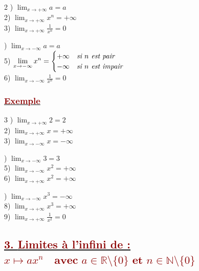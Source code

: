 \documentclass[12pt,a4paper]{article}
\begin{document}
\begin{multicols}{2}
) $\displaystyle \lim_{x \to +\infty} a = a$ \\[0.5cm]
2) $\displaystyle \lim_{x \to +\infty} x^n = +\infty$ \\[0.5cm]
3) $\displaystyle \lim_{x \to +\infty} \frac{1}{x^n} = 0$

\columnbreak

) $\displaystyle \lim_{x \to -\infty} a = a$ \\[0.3cm]
5) $\displaystyle \lim_{x \to -\infty} x^n = \begin{cases} +\infty & \text{\textit{si $n$ est pair}} \\ -\infty & \text{\textit{si $n$ est impair}} \end{cases}$ \\[0.3cm]
6) $\displaystyle \lim_{x \to -\infty} \frac{1}{x^n} = 0$
\end{multicols}

\subsubsection*{\underline{\textcolor{darkred}{ Exemple }}}

\begin{multicols}{3}
) $\displaystyle \lim_{x \to +\infty} 2 = 2$ \\[0.6cm]
2) $\displaystyle \lim_{x \to +\infty} x = +\infty$ \\[0.6cm]
3) $\displaystyle \lim_{x \to -\infty} x = -\infty$

\columnbreak

) $\displaystyle \lim_{x \to -\infty} 3 = 3$ \\[0.6cm]
5) $\displaystyle \lim_{x \to -\infty} x^2 = +\infty$ \\[0.6cm]
6) $\displaystyle \lim_{x \to +\infty} x^2 = +\infty$

\columnbreak

) $\displaystyle \lim_{x \to -\infty} x^3 = -\infty$ \\[0.6cm]
8) $\displaystyle \lim_{x \to +\infty} x^3 = +\infty$ \\[0.6cm]
9) $\displaystyle \lim_{x \to +\infty} \frac{1}{x^2} = 0$
\end{multicols}

\subsection*{\underline{\textcolor{darkred}{ 3. \noindent\textbf{Limites à l'infini de :} $x \mapsto ax^n \quad \textbf{avec } a \in \mathbb{R} \setminus \{0\} \textbf{ et } n \in \mathbb{N} \setminus \{0\}$}}}
\end{document}
